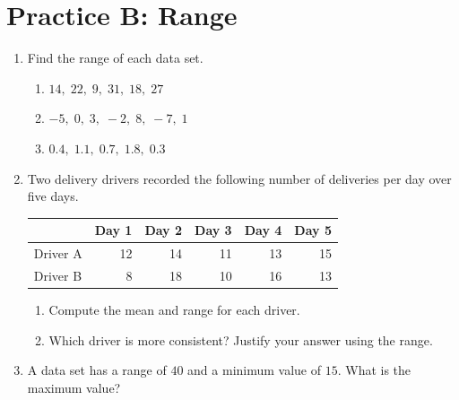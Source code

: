 \section*{Practice B: Range}
\begin{enumerate}[label=B\arabic*.,leftmargin=2.5em,itemsep=10pt]
  \item Find the range of each data set.
    \begin{enumerate}[label=(\alph*), itemsep=4pt]
      \item $14,\; 22,\; 9,\; 31,\; 18,\; 27$
      \item $-5,\; 0,\; 3,\; -2,\; 8,\; -7,\; 1$
      \item $0.4,\; 1.1,\; 0.7,\; 1.8,\; 0.3$
    \end{enumerate}

  \item Two delivery drivers recorded the following number
    of deliveries per day over five days.
    \begin{center}
    \renewcommand{\arraystretch}{1.4}
    \begin{tabular}{lrrrrr}
    \toprule
    & Day 1 & Day 2 & Day 3 & Day 4 & Day 5 \\
    \midrule
    Driver A & 12 & 14 & 11 & 13 & 15 \\
    Driver B & 8  & 18 & 10 & 16 & 13 \\
    \bottomrule
    \end{tabular}
    \end{center}
    \begin{enumerate}[label=(\alph*), itemsep=4pt]
      \item Compute the mean and range for each driver.
      \item Which driver is more consistent?
        Justify your answer using the range.
    \end{enumerate}

  \item A data set has a range of $40$ and a minimum value
    of $15$. What is the maximum value?

\end{enumerate}

